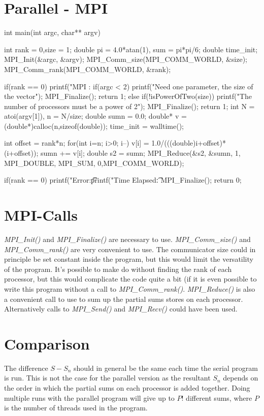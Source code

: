 \documentclass[11pt,a4paper,english]{article}
\begin{document}
\section{Parallel - MPI}
\begin{ccode}
int main(int argc, char** argv){
    int rank = 0,size = 1;
    double pi = 4.0*atan(1), sum = pi*pi/6;
    double time_init;
    MPI_Init(&argc, &argv);
    MPI_Comm_size(MPI_COMM_WORLD, &size);
    MPI_Comm_rank(MPI_COMM_WORLD, &rank);

    if(rank == 0){
        printf("MPI   \tThreadcount: %
        if(argc < 2) {
            printf("Need one parameter, the size of the vector\n");
            MPI_Finalize();
            return 1;
        }else if(!isPowerOfTwo(size)){
            printf("The number of processors must be a power of 2\n");
            MPI_Finalize();
            return 1;
        }
    }
    int N = atoi(argv[1]), n = N/size;
    double sumn = 0.0;
    double* v = (double*)calloc(n,sizeof(double));
    time_init = walltime();

    int offset = rank*n;
    for(int i=n; i>0; i--){
        v[i] = 1.0/(((double)i+offset)*(i+offset));
        sumn += v[i];
    }
    double s2 = sumn;
    MPI_Reduce(&s2, &sumn, 1, MPI_DOUBLE, MPI_SUM, 0,MPI_COMM_WORLD);

    if(rank == 0){
        printf("Error:\t\t %
        printf("Time Elapsed:\t %
    }
    MPI_Finalize();
    return 0;
}
\end{ccode}

\section{MPI-Calls}
\textit{MPI\_Init()} and \textit{MPI\_Finalize()} are necessary to
use. \textit{MPI\_Comm\_size()} and
\textit{MPI\_Comm\_rank()} are very convenient to use. The
communicator size could in principle be set constant inside the program, but
this would limit the versatility of the program. It's possible to make do
without finding the rank of each processor, but this would complicate the code
quite a bit (if it is even possible to write this program without a call to
\textit{MPI\_Comm\_rank()}. \textit{MPI\_Reduce()} is also a convenient call to
use to sum up the partial sums stores on each processor. Alternatively calls to
\textit{MPI\_Send()} and \textit{MPI\_Recv()} could have been used.
    
\section{Comparison}
The difference $S-S_n$ should in general be the same each time the serial
program is run. This is not the case for the parallel version as the resultant
$S_n$ depends on the order in which the partial sums on each processor is added
together. Doing multiple runs with the parallel program will give up to $P!$
different sums, where $P$ is the number of threads used in the program.
\end{document}
